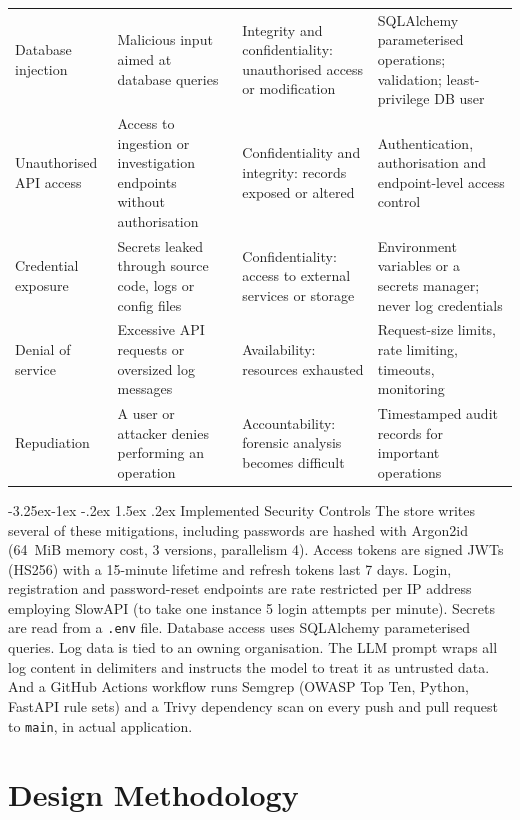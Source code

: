 \documentclass[12pt,a4paper]{report}
\makeatletter
\renewcommand\subsection{\@startsection{subsection}{2}{\z@}%
  {-3.25ex\@plus -1ex \@minus -.2ex}%
  {1.5ex \@plus .2ex}%
  {\normalfont\fontsize{12}{18}\selectfont\bfseries}}
\makeatother
\begin{document}
\begin{longtable}{>{\raggedright\arraybackslash}p{2.1cm} >{\raggedright\arraybackslash}p{4.2cm} >{\raggedright\arraybackslash}p{4.0cm} >{\raggedright\arraybackslash}p{5.4cm}}
Database injection & Malicious input aimed at database queries & Integrity and confidentiality: unauthorised access or modification & SQLAlchemy parameterised operations; validation; least-privilege DB user\\
Unauthorised API access & Access to ingestion or investigation endpoints without authorisation & Confidentiality and integrity: records exposed or altered & Authentication, authorisation and endpoint-level access control\\
Credential exposure & Secrets leaked through source code, logs or config files & Confidentiality: access to external services or storage & Environment variables or a secrets manager; never log credentials\\
Denial of service & Excessive API requests or oversized log messages & Availability: resources exhausted & Request-size limits, rate limiting, timeouts, monitoring\\
Repudiation & A user or attacker denies performing an operation & Accountability: forensic analysis becomes difficult & Timestamped audit records for important operations\\
\end{longtable}

\subsection{Implemented Security Controls}
The store writes several of these mitigations, including passwords are hashed with Argon2id (64~MiB memory cost, 3 versions, parallelism 4). Access tokens are signed JWTs (HS256) with a 15-minute lifetime and refresh tokens last 7 days. Login, registration and password-reset endpoints are rate restricted per IP address employing SlowAPI (to take one instance 5 login attempts per minute). Secrets are read from a \texttt{.env} file. Database access uses SQLAlchemy parameterised queries. Log data is tied to an owning organisation. The LLM prompt wraps all log content in delimiters and instructs the model to treat it as untrusted data. And a GitHub Actions workflow runs Semgrep (OWASP Top Ten, Python, FastAPI rule sets) and a Trivy dependency scan on every push and pull request to \texttt{main}, in actual application.

\chapter{Design Methodology}
\end{document}
